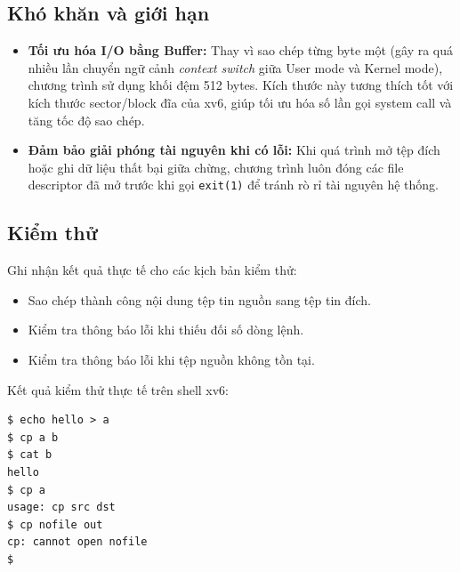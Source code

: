 \subsection{Khó khăn và giới hạn}
\begin{itemize}
  \item \textbf{Tối ưu hóa I/O bằng Buffer:} Thay vì sao chép từng byte một (gây ra quá nhiều lần chuyển ngữ cảnh \textit{context switch} giữa User mode và Kernel mode), chương trình sử dụng khối đệm 512 bytes. Kích thước này tương thích tốt với kích thước sector/block đĩa của xv6, giúp tối ưu hóa số lần gọi system call và tăng tốc độ sao chép.
  \item \textbf{Đảm bảo giải phóng tài nguyên khi có lỗi:} Khi quá trình mở tệp đích hoặc ghi dữ liệu thất bại giữa chừng, chương trình luôn đóng các file descriptor đã mở trước khi gọi \texttt{exit(1)} để tránh rò rỉ tài nguyên hệ thống.
\end{itemize}

\subsection{Kiểm thử}
Ghi nhận kết quả thực tế cho các kịch bản kiểm thử:
\begin{itemize}
  \item Sao chép thành công nội dung tệp tin nguồn sang tệp tin đích.
  \item Kiểm tra thông báo lỗi khi thiếu đối số dòng lệnh.
  \item Kiểm tra thông báo lỗi khi tệp nguồn không tồn tại.
\end{itemize}

\noindent Kết quả kiểm thử thực tế trên shell xv6:

\begin{center}
\begin{minipage}{0.86\textwidth}
\begin{lstlisting}[numbers=none,xleftmargin=0pt,framexleftmargin=0pt]
$ echo hello > a
$ cp a b
$ cat b
hello
$ cp a
usage: cp src dst
$ cp nofile out
cp: cannot open nofile
$
\end{lstlisting}
\end{minipage}
\end{center}
